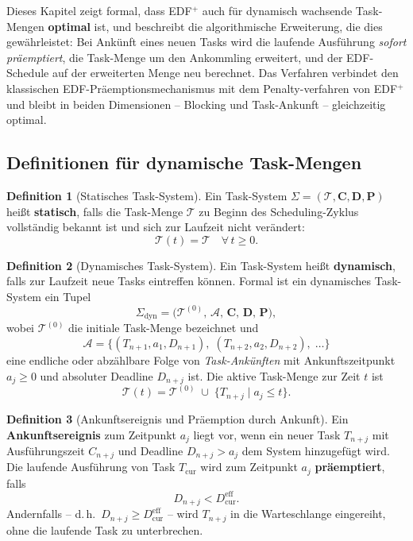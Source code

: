 ﻿\documentclass[a4paper,12pt]{article}
\theoremstyle{definition}
\newtheorem{definition}{Definition}
\begin{document}
	Dieses Kapitel zeigt formal, dass EDF$^+$ auch für dynamisch wachsende Task-Mengen
	\textbf{optimal} ist, und beschreibt die algorithmische Erweiterung, die dies
	gewährleistet: Bei Ankünft eines neuen Tasks wird die laufende Ausführung
	\emph{sofort präemptiert}, die Task-Menge um den Ankommling erweitert, und der
	EDF-Schedule auf der erweiterten Menge neu berechnet. Das Verfahren verbindet den
	klassischen EDF-Präemptionsmechanismus mit dem Penalty-verfahren von EDF$^+$ und
	bleibt in beiden Dimensionen -- Blocking und Task-Ankunft -- gleichzeitig optimal.

	\subsection{Definitionen für dynamische Task-Mengen}

	\begin{definition}[Statisches Task-System]
		Ein Task-System $\Sigma = (\mathcal{T}, \mathbf{C}, \mathbf{D}, \mathbf{P})$
		hei\ss{}t \textbf{statisch}, falls die Task-Menge $\mathcal{T}$ zu Beginn des
		Scheduling-Zyklus vollständig bekannt ist und sich zur Laufzeit nicht verändert:
		\[
		\mathcal{T}(t) = \mathcal{T} \quad \forall\, t \ge 0.
		\]
	\end{definition}

	\begin{definition}[Dynamisches Task-System]
		\label{def:dynamisch}
		Ein Task-System hei\ss{}t \textbf{dynamisch}, falls zur Laufzeit neue Tasks
		eintreffen können. Formal ist ein dynamisches Task-System ein Tupel
		\[
		\Sigma_{\mathrm{dyn}} = \bigl(\mathcal{T}^{(0)},\, \mathcal{A},\, \mathbf{C},\,
		\mathbf{D},\, \mathbf{P}\bigr),
		\]
		wobei $\mathcal{T}^{(0)}$ die initiale Task-Menge bezeichnet und
		\[
		\mathcal{A} = \bigl\{(T_{n+1}, a_1, D_{n+1}),\;(T_{n+2}, a_2, D_{n+2}),\;\ldots\bigr\}
		\]
		eine endliche oder abzählbare Folge von \emph{Task-Ankünften} mit
		Ankunftszeitpunkt $a_j \ge 0$ und absoluter Deadline $D_{n+j}$ ist.
		Die aktive Task-Menge zur Zeit $t$ ist
		\[
		\mathcal{T}(t) = \mathcal{T}^{(0)} \;\cup\; \bigl\{T_{n+j} \mid a_j \le t\bigr\}.
		\]
	\end{definition}

	\begin{definition}[Ankunftsereignis und Präemption durch Ankunft]
		\label{def:ankunft}
		Ein \textbf{Ankunftsereignis} zum Zeitpunkt $a_j$ liegt vor, wenn ein neuer
		Task $T_{n+j}$ mit Ausführungszeit $C_{n+j}$ und Deadline $D_{n+j} > a_j$
		dem System hinzugefügt wird. Die laufende Ausführung von Task $T_{\mathrm{cur}}$
		wird zum Zeitpunkt $a_j$ \textbf{präemptiert}, falls
		\[
		D_{n+j} < D_{\mathrm{cur}}^{\text{eff}}.
		\]
		Andernfalls -- d.\,h.\  $D_{n+j} \ge D_{\mathrm{cur}}^{\text{eff}}$ -- wird
		$T_{n+j}$ in die Warteschlange eingereiht, ohne die laufende Task zu unterbrechen.
	\end{definition}
\end{document}
